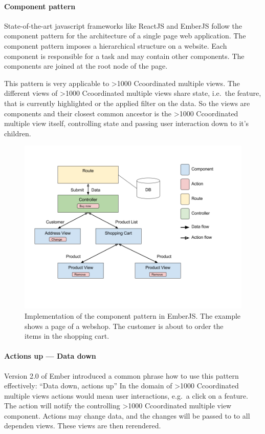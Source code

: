 \documentclass{article}
\newcommand\hmm[1]{\ifnum\ifhmode\spacefactor\else2000\fi>1000 \uppercase{#1}\else#1\fi}
\newcommand{\cmv}{\hmm{c}oordinated multiple view}
\newcommand{\cmvs}{\hmm{c}oordinated multiple views}
\begin{document}
\paragraph{Component pattern}
State-of-the-art javascript frameworks like ReactJS and EmberJS follow the component pattern for the architecture of a single page web application.
The component pattern imposes a hierarchical structure on a website.
Each component is responsible for a task and may contain other components.
The components are joined at the root node of the page.

This pattern is very applicable to \cmvs{}.
The different views of \cmvs{} share state, i.e.\ the feature, that is currently highlighted or the applied filter on the data.
So the views are components and their closest common ancestor is the \cmv{} itself, controlling state and passing user interaction down to it's children.

\begin{figure}[h!]
  \centering
  \includegraphics[width=\textwidth]{images/data-down-actions-up.png}
  \caption{%
    Implementation of the component pattern in EmberJS\@.
    The example shows a page of a webshop.
    The customer is about to order the items in the shopping cart.
  }\label{fig:implementation:data-down-actions-up}
\end{figure}

\paragraph{Actions up --- Data down}

Version 2.0 of Ember introduced a common phrase how to use this pattern effectively: ``Data down, actions up''\cite{Emberigniter2017}
In the domain of \cmvs{} actions would mean user interactions, e.g.\ a click on a feature.
The action will notify the controlling \cmv{} component.
Actions may change data, and the changes will be passed to to all dependen views.
These views are then rerendered.
\end{document}
